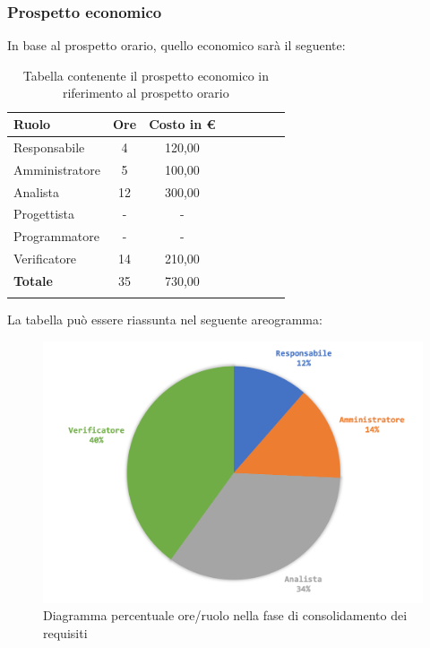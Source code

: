 		\subsubsection{Prospetto economico}
		In base al prospetto orario, quello economico sarà il seguente: 
		
			\begin{longtable}{|l|c|c|c|c|c|c|c|}
				\hline
				\rowcolor{lighter-grayer}
				\textbf{Ruolo} & \textbf{Ore} & \textbf{Costo in €} \\
				\hline
				\endfirsthead
				
				\hline
				Responsabile & 4 & 120,00\\
				\hline
				\hline
				Amministratore & 5 & 100,00\\
				\hline
				\hline
				Analista & 12 & 300,00\\
				\hline
				\hline
				Progettista & - & -\\
				\hline
				\hline
				Programmatore & -  & -\\
				\hline
				\hline
				Verificatore & 14 & 210,00\\
				\hline
				\textbf{Totale} & 35 & 730,00\\
				\hline
				\caption{Tabella contenente il prospetto economico in riferimento al prospetto orario}
			\end{longtable}
			\pagebreak
			
			La tabella può essere riassunta nel seguente areogramma:
			\begin{figure}[H]
				\centering
				\includegraphics[width=0.8\linewidth]{./images/preventivo/consRequisiti2.png}
				\caption{Diagramma percentuale ore/ruolo nella fase di consolidamento dei requisiti}
				\label{fig:diagramma costi ruolo fase consolidamento dei requisiti}
			\end{figure}
	
